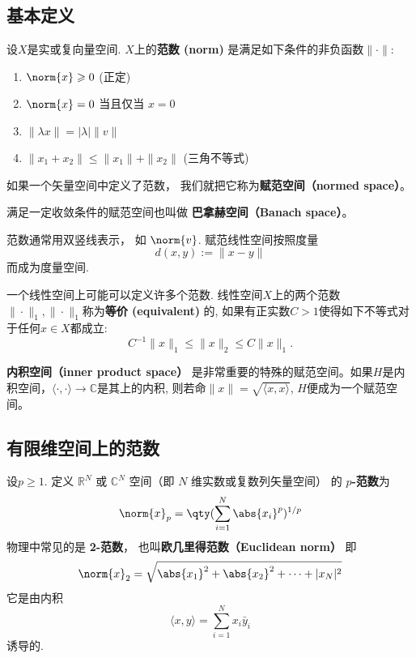 

\subsection{基本定义}

设$X$是实或复向量空间. $X$上的\textbf{范数 (norm)} 是满足如下条件的非负函数$\|\cdot\|$:
\begin{enumerate}
\item $\norm{x} \geqslant 0$ (正定)
\item $\norm{x} = 0$ 当且仅当 $x = 0$
\item $\|\lambda x\| = |\lambda|\| v\|$
\item $\|x_1+x_2\| \leqslant \|x_1\|+ \|x_2\|$ (三角不等式)
\end{enumerate}
如果一个矢量空间中定义了范数， 我们就把它称为\textbf{赋范空间（normed space）}。

满足一定收敛条件的赋范空间也叫做 \textbf{巴拿赫空间（Banach space）}。%

范数通常用双竖线表示， 如 $\norm{v}$. 赋范线性空间按照度量
$$
d(x,y):=\|x-y\|
$$
而成为度量空间. 

一个线性空间上可能可以定义许多个范数. 线性空间$X$上的两个范数$\|\cdot\|_1,\|\cdot\|_1$称为\textbf{等价 (equivalent)} 的, 如果有正实数$C>1$使得如下不等式对于任何$x\in X$都成立:
$$
C^{-1}\|x\|_{1}\leq\|x\|_2\leq C\|x\|_1.
$$

\textbf{内积空间（inner product space）} 是非常重要的特殊的赋范空间。如果$H$是内积空间，$\langle\cdot,\cdot\rangle\to\mathbb C$是其上的内积, 则若命$\|x\|=\sqrt{\langle x,x\rangle }$, $H$便成为一个赋范空间。

\subsection{有限维空间上的范数}
设$p\geq1$. 定义 $\mathbb R^N$ 或 $\mathbb C^N$ 空间（即 $N$ 维实数或复数列矢量空间） 的 \textbf{$p$-范数}为
\begin{equation}
\norm{ x}_p = \qty(\sum_{i=1}^N \abs{x_i}^p)^{1/p}
\end{equation}
物理中常见的是 \textbf{2-范数}， 也叫\textbf{欧几里得范数（Euclidean norm）} 即
\begin{equation}
\norm{ x}_2 = \sqrt{\abs{x_1}^2 + \abs{x_2}^2 + \dots+|x_N|^2}
\end{equation}
它是由内积
$$
\langle x,y\rangle=\sum_{i=1}^Nx_i\bar y_i
$$
诱导的.

